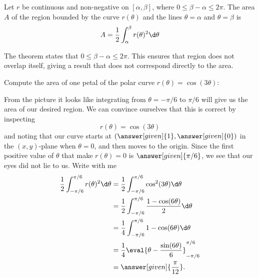 \documentclass{ximera}
\begin{document}
\begin{theorem}
Let $r$ be continuous and non-negative on $[\alpha,\beta]$, where
$0\leq \beta-\alpha\leq 2\pi$. The area $A$ of the region bounded by
the curve $r(\theta)$ and the lines $\theta=\alpha$ and
$\theta=\beta$ is
\[
A  =  \frac12\int_\alpha^\beta r(\theta)^2 \d \theta  
\]
\end{theorem}

The theorem states that $0\leq \beta-\alpha\leq 2\pi$. This ensures
that region does not overlap itself, giving a result that does not
correspond directly to the area.


\begin{example}
  Compute the area of one petal of the polar curve $r(\theta) =
  \cos(3\theta)$:
  \begin{image}
  \end{image}
  \begin{explanation}
    From the picture it looks like integrating from
    $\theta=-\pi/6$ to $\pi/6$ will give us the area
      of our desired region. We can convince ourselves that this is
      correct by inspecting
      \[
      r(\theta) = \cos(3\theta)
      \]
      and noting that our curve starts at
      $(\answer[given]{1},\answer[given]{0})$ in the $(x,y)$-plane
      when $\theta=0$, and then moves to the origin. Since the first
      positive value of $\theta$ that make $r(\theta)= 0$ is
      $\answer[given]{\pi/6}$, we see that our eyes did not lie to
      us. Write with me
      \begin{align*}
      \frac{1}{2}\int_{-\pi/6}^{\pi/6} r(\theta)^2 \d \theta &= \frac{1}{2}\int_{-\pi/6}^{\pi/6} \cos^2(3\theta) \d \theta\\
      &= \frac{1}{2}\int_{-\pi/6}^{\pi/6} \frac{1-\cos(6\theta)}{2} \d \theta\\
      &= \frac{1}{4}\int_{-\pi/6}^{\pi/6} 1-\cos(6\theta) \d \theta\\
      &= \frac{1}{4}\eval{\theta-\frac{\sin(6\theta)}{6}}_{-\pi/6}^{\pi/6}\\
      &= \answer[given]{\frac{\pi}{12}}.
      \end{align*}
  \end{explanation}
\end{example}
\end{document}
